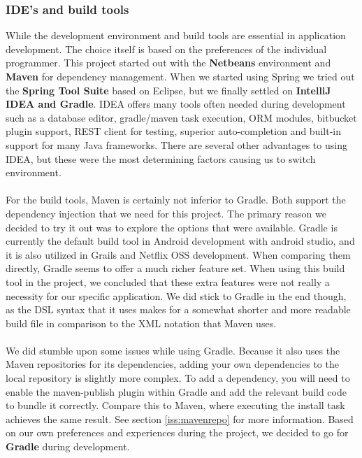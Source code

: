 \documentclass[12pt]{article}
\begin{document}
\begin{multicols}{2}
\subsubsection{IDE's and build tools}\label{sec:idebuild}
While the development environment and build tools are essential in application development. The choice itself is based on the preferences of the individual programmer. This project started out with the \textbf{Netbeans} environment and \textbf{Maven} for dependency management. When we started using Spring we tried out the \textbf{Spring Tool Suite} based on Eclipse, but we finally settled on \textbf{IntelliJ IDEA and Gradle}. IDEA offers many tools often needed during development such as a database editor, gradle/maven task execution, ORM modules, bitbucket plugin support, REST client for testing, superior auto-completion and built-in support for many Java frameworks. There are several other advantages to using IDEA, but these were the most determining factors causing us to switch environment. 
\\\\
For the build tools, Maven is certainly not inferior to Gradle. Both support the dependency injection that we need for this project. The primary reason we decided to try it out was to explore the options that were available. Gradle is currently the default build tool in Android development with android studio, and it is also utilized in Grails and Netflix OSS development. When comparing them directly, Gradle seems to offer a much richer feature set. \cite{GradleVsMaven48:online} When using this build tool in the project, we concluded that these extra features were not really a necessity for our specific application. We did stick to Gradle in the end though, as the DSL syntax that it uses makes for a somewhat shorter and more readable build file in comparison to the XML notation that Maven uses. 
\\\\
We did stumble upon some issues while using Gradle. Because it also uses the Maven repositories for its dependencies, adding your own dependencies to the local repository is slightly more complex. To add a dependency, you will need to enable the maven-publish plugin within Gradle and add the relevant build code to bundle it correctly. Compare this to Maven, where executing the install task achieves the same result. See section \ref{iss:mavenrepo} for more information. Based on our own preferences and experiences during the project, we decided to go for \textbf{Gradle} during development.

\end{multicols}
\end{document}
